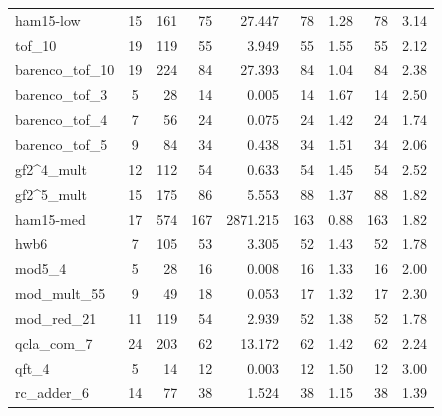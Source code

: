 \begin{table}[htbp]
\begin{tabular}{l c r | r r | r r | r r}
ham15-low & 15 & 161 & \cellcolor{bestT}75 & 27.447 & 78 & 1.28 & 78 & \cellcolor{bestSpeed}3.14 \\
tof\_10 & 19 & 119 & \cellcolor{bestT}55 & 3.949 & \cellcolor{bestT}55 & 1.55 & \cellcolor{bestT}55 & \cellcolor{bestSpeed}2.12 \\
barenco\_tof\_10 & 19 & 224 & \cellcolor{bestT}84 & 27.393 & \cellcolor{bestT}84 & 1.04 & \cellcolor{bestT}84 & \cellcolor{bestSpeed}2.38 \\
barenco\_tof\_3 & 5 & 28 & \cellcolor{bestT}14 & 0.005 & \cellcolor{bestT}14 & 1.67 & \cellcolor{bestT}14 & \cellcolor{bestSpeed}2.50 \\
barenco\_tof\_4 & 7 & 56 & \cellcolor{bestT}24 & 0.075 & \cellcolor{bestT}24 & 1.42 & \cellcolor{bestT}24 & \cellcolor{bestSpeed}1.74 \\
barenco\_tof\_5 & 9 & 84 & \cellcolor{bestT}34 & 0.438 & \cellcolor{bestT}34 & 1.51 & \cellcolor{bestT}34 & \cellcolor{bestSpeed}2.06 \\
gf2\textasciicircum4\_mult & 12 & 112 & \cellcolor{bestT}54 & 0.633 & \cellcolor{bestT}54 & 1.45 & \cellcolor{bestT}54 & \cellcolor{bestSpeed}2.52 \\
gf2\textasciicircum5\_mult & 15 & 175 & \cellcolor{bestT}86 & 5.553 & 88 & 1.37 & 88 & \cellcolor{bestSpeed}1.82 \\
ham15-med & 17 & 574 & 167 & 2871.215 & \cellcolor{bestT}163 & 0.88 & \cellcolor{bestT}163 & \cellcolor{bestSpeed}1.82 \\
hwb6 & 7 & 105 & 53 & 3.305 & \cellcolor{bestT}52 & 1.43 & \cellcolor{bestT}52 & \cellcolor{bestSpeed}1.78 \\
mod5\_4 & 5 & 28 & \cellcolor{bestT}16 & 0.008 & \cellcolor{bestT}16 & 1.33 & \cellcolor{bestT}16 & \cellcolor{bestSpeed}2.00 \\
mod\_mult\_55 & 9 & 49 & 18 & 0.053 & \cellcolor{bestT}17 & 1.32 & \cellcolor{bestT}17 & \cellcolor{bestSpeed}2.30 \\
mod\_red\_21 & 11 & 119 & 54 & 2.939 & \cellcolor{bestT}52 & 1.38 & \cellcolor{bestT}52 & \cellcolor{bestSpeed}1.78 \\
qcla\_com\_7 & 24 & 203 & \cellcolor{bestT}62 & 13.172 & \cellcolor{bestT}62 & 1.42 & \cellcolor{bestT}62 & \cellcolor{bestSpeed}2.24 \\
qft\_4 & 5 & 14 & \cellcolor{bestT}12 & 0.003 & \cellcolor{bestT}12 & 1.50 & \cellcolor{bestT}12 & \cellcolor{bestSpeed}3.00 \\
rc\_adder\_6 & 14 & 77 & \cellcolor{bestT}38 & 1.524 & \cellcolor{bestT}38 & 1.15 & \cellcolor{bestT}38 & \cellcolor{bestSpeed}1.39 \\

\end{tabular}
\end{table}
